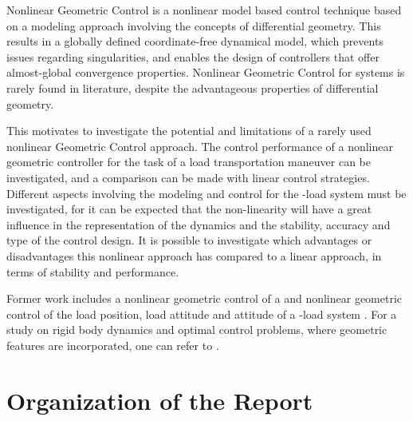 %


Nonlinear Geometric Control is a nonlinear model based control technique based on a modeling approach involving the concepts of differential geometry. This results in a globally defined coordinate-free dynamical model, which prevents issues regarding singularities, and enables the design of controllers that offer almost-global convergence properties. 
Nonlinear Geometric Control for  systems is rarely found in literature, despite the advantageous properties of differential geometry. 

This motivates to investigate the potential and limitations of a rarely used nonlinear Geometric Control approach.
The control performance of a nonlinear geometric controller for the task of a load transportation maneuver can be investigated, and a comparison can be made with linear control strategies.\\
Different aspects involving the modeling and control for the -load system must be investigated, for it can be expected that the non-linearity will have a great influence in the representation of the dynamics and the stability, accuracy and type of the control design.
It is possible to investigate which advantages or disadvantages this nonlinear approach has compared to a linear approach, in terms of stability and performance.

Former work includes a nonlinear geometric control of a  \cite{Lee2010,Goodarzi2013a} and nonlinear geometric control of the load position, load attitude and  attitude of a -load system \cite{Sreenath2013a,Sreenath2013b,Tang2014}. 
For a study on rigid body dynamics and optimal control problems, where geometric features are incorporated, one can refer to \cite{Lee2008,Bullo2005}. 


\section{Organization of the Report}

